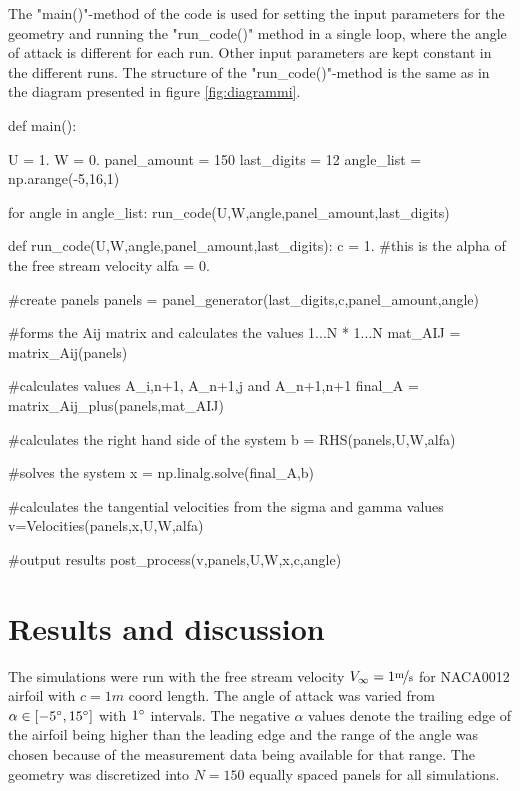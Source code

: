 \documentclass[a4paper,12pt]{article}
\begin{document}
The "main()"-method of the code is used for setting the input parameters for the geometry and running the "run\_code()" method in a single loop, where the angle of attack is different for each run. Other input parameters are kept constant in the different runs. The structure of the "run\_code()"-method is the same as in the diagram presented in figure \ref{fig:diagrammi}.
\begin{python}
def main():
        
        U = 1.
        W = 0.
        panel_amount = 150
        last_digits = 12
        angle_list = np.arange(-5,16,1)       
        
        for angle in angle_list:
                run_code(U,W,angle,panel_amount,last_digits)

def run_code(U,W,angle,panel_amount,last_digits):
        c = 1.
        #this is the alpha of the free stream velocity
        alfa = 0.
        
        #create panels
        panels = panel_generator(last_digits,c,panel_amount,angle)
             
        #forms the Aij matrix and calculates the values 1...N * 1...N
        mat_AIJ = matrix_Aij(panels)
        
        #calculates values A_i,n+1, A_n+1,j and A_n+1,n+1
        final_A = matrix_Aij_plus(panels,mat_AIJ)
              
        #calculates the right hand side of the system
        b = RHS(panels,U,W,alfa)
        
        #solves the system
        x = np.linalg.solve(final_A,b)

        #calculates the tangential velocities from the sigma and gamma values
        v=Velocities(panels,x,U,W,alfa)

        #output results
        post_process(v,panels,U,W,x,c,angle)
\end{python}




\newpage
\section{Results and discussion}
 
The simulations were run with the free stream velocity $V_\infty = 1\unitfrac{m}{s}$ for NACA0012 airfoil with $c=1\unit{m}$ coord length. The angle of attack was varied from $\alpha \in [-5\degree , 15\degree]$ with $1\degree$ intervals. The negative $\alpha$ values denote the trailing edge of the airfoil being higher than the leading edge and the range of the angle was chosen because of the measurement data being available for that range. The geometry was discretized into $N=150$ equally spaced panels for all simulations. 
\end{document}

